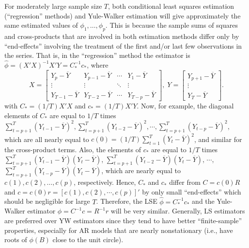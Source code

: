 For moderately large sample size $T$, both conditional least squares estimation (``regression'' methods) and Yule-Walker estimation will give approximately the same estimated values of $\phi_1,\ldots,\phi_p$. This is because the sample sums of squares and cross-products that are involved in both estimation methods differ only by ``end-effects'' involving the treatment of the first and/or last few observations in the series. That is, in the ``regression'' method the estimator is $\hat{\phi} = (X'X)^{-1}X'Y = C_{*}^{-1}c_*$, where
	\[
	X=
	\begin{bmatrix}
	Y_p - \overline{Y} & Y_{p-1} - \overline{Y} & \cdots & Y_1 - \overline{Y} \\
	\vdots & \vdots & \ddots & \vdots \\
	Y_{T-1} - \overline{Y} & Y_{T-2} - \overline{Y} & \cdots & Y_{T-p} - \overline{Y}
	\end{bmatrix}, \;
	Y=
	\begin{bmatrix}
	Y_{p+1} - \overline{Y} \\
	\vdots \\
	Y_T - \overline{Y}
	\end{bmatrix}.
	\]
with $C_*= (1/T)X'X$ and $c_*= (1/T)X'Y$. Now, for example, the diagonal elements of $C_*$ are equal to $1/T$ times $\sum_{t=p+1}^T(Y_{t-1} - \overline{Y})^2, \sum_{t=p+1}^T(Y_{t-2} - \overline{Y})^2,\cdots,\sum_{t=p+1}^T(Y_{t-p} - \overline{Y})^2$, which are all nearly equal to $c(0) = (1/T)\sum_{t=1}^T(Y_t - \overline{Y})^2$, and similar for the cross-product terms. Also, the elements of $c_*$ are equal to $1/T$ times $\sum_{t=p+1}^T(Y_{t-1} - \overline{Y})(Y_t - \overline{Y})$, $\sum_{t=p+1}^T(Y_{t-2} - \overline{Y})(Y_t - \overline{Y})$, $\cdots$, $\sum_{t=p+1}^T(Y_{t-p} - \overline{Y})(Y_t - \overline{Y})$, which are nearly equal to $c(1),c(2),\ldots,c(p)$, respectively. Hence, $C_*$ and $c_*$ differ from $C = c(0)R$ and $c = c(0)r = [c(1),c(2),\cdots,c(p)]'$ by only small ``end-effects'' which should be negligible for large $T$. Therefore, the LSE $\hat{\phi} = C_*^{-1}c_*$ and the Yule-Walker estimator $\hat{\phi} = C^{-1}c = R^{-1}r$ will be very similar. Generally, LS estimators are preferred over YW estimators since they tend to have better ``finite-sample'' properties, especially for AR models that are nearly nonstationary (i.e., have roots of $\phi(B)$ close to the unit circle).


